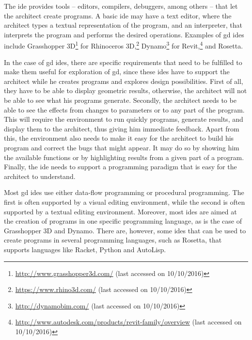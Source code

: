 The \gls{ide} provides tools -- editors, compilers, debuggers, among others -- that let the architect create programs.
A basic \gls{ide} may have a text editor, where the architect types a textual representation of the program, and an interpreter, that interprets the program and performs the desired operations.
Examples of \gls{gd} \glspl{ide} include Grasshopper 3D\footnote{\url{http://www.grasshopper3d.com/} (last accessed on 10/10/2016)} for Rhinoceros 3D,\footnote{\url{https://www.rhino3d.com/} (last accessed on 10/10/2016)} Dynamo\footnote{\url{http://dynamobim.com/} (last accessed on 10/10/2016)} for Revit,\footnote{\url{http://www.autodesk.com/products/revit-family/overview} (last accessed on 10/10/2016)} and Rosetta\cite{de2012modern}.

In the case of \gls{gd} \glspl{ide}, there are specific requirements that need to be fulfilled to make them useful for exploration of \gls{gd}, since these \glspl{ide} have to support the architect while he creates programs and explores design possibilities.
First of all, they have to be able to display geometric results, otherwise, the architect will not be able to see what his programs generate.
Secondly, the architect needs to be able to see the effects from changes to parameters or to any part of the program.
This will require the environment to run quickly programs, generate results, and display them to the architect, thus giving him immediate feedback.
Apart from this, the environment also needs to make it easy for the architect to build his program and correct the bugs that might appear.
It may do so by showing him the available functions or by highlighting results from a given part of a program.
Finally, the \gls{ide} needs to support a programming paradigm that is easy for the architect to understand.

Most \gls{gd} \glspl{ide} use either data-flow programming or procedural programming.
The first is often supported by a visual editing environment, while the second is often supported by a textual editing environment.
Moreover, most \glspl{ide} are aimed at the creation of programs in one specific programming language, as is the case of Grasshopper 3D and Dynamo.
There are, however, some \glspl{ide} that can be used to create programs in several programming languages, such as Rosetta, that supports languages like Racket\cite{flatt2016racket}, Python\cite{rossum2003python} and AutoLisp.

